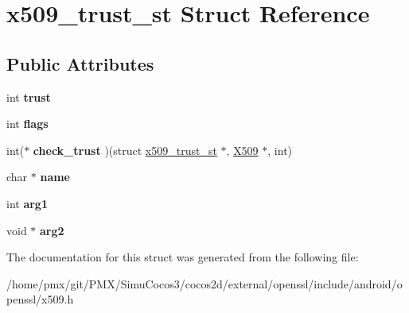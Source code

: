 \hypertarget{structx509__trust__st}{}\section{x509\+\_\+trust\+\_\+st Struct Reference}
\label{structx509__trust__st}
\subsection*{Public Attributes}
\begin{DoxyCompactItemize}
\item 
\mbox{\label{structx509__trust__st_a6840735427ee479d8796da9e838d6a77}} 
int {\bfseries trust}
\item 
\mbox{\label{structx509__trust__st_aee3ce09b9d6184cd66ad624b5689a676}} 
int {\bfseries flags}
\item 
\mbox{\label{structx509__trust__st_a9d2b93c90f8f7537602cf9100e9b81e2}} 
int($\ast$ {\bfseries check\+\_\+trust} )(struct \hyperlink{structx509__trust__st}{x509\+\_\+trust\+\_\+st} $\ast$, \hyperlink{structx509__st}{X509} $\ast$, int)
\item 
\mbox{\label{structx509__trust__st_a5ceb18f03d1ecdd24474160dc749910e}} 
char $\ast$ {\bfseries name}
\item 
\mbox{\label{structx509__trust__st_a97e2b1d9d69d10172d982776c337c6d9}} 
int {\bfseries arg1}
\item 
\mbox{\label{structx509__trust__st_a76ac9bf20e5766af1c27d4ba18c74243}} 
void $\ast$ {\bfseries arg2}
\end{DoxyCompactItemize}


The documentation for this struct was generated from the following file\+:\begin{DoxyCompactItemize}
\item 
/home/pmx/git/\+P\+M\+X/\+Simu\+Cocos3/cocos2d/external/openssl/include/android/openssl/x509.\+h\end{DoxyCompactItemize}
